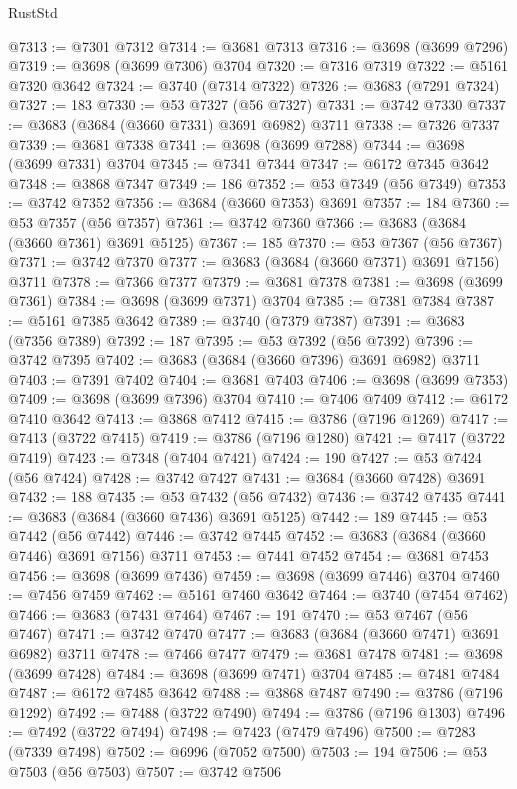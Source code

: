 \begin{lexlean}{RustStd}
\begin{coremodule}
{\begin{coremodule}
{{{{{{{{{{{{{{{{{{{{{{{{{{{{{{{{{{{{{{{{{{{{{{{@7313 := @7301 @7312
@7314 := @3681 @7313
@7316 := @3698 (@3699 @7296)
@7319 := @3698 (@3699 @7306) @3704
@7320 := @7316 @7319
@7322 := @5161 @7320 @3642
@7324 := @3740 (@7314 @7322)
@7326 := @3683 (@7291 @7324)
@7327 := 183
@7330 := @53 @7327 (@56 @7327)
@7331 := @3742 @7330
@7337 := @3683 (@3684 (@3660 @7331) @3691 @6982) @3711
@7338 := @7326 @7337
@7339 := @3681 @7338
@7341 := @3698 (@3699 @7288)
@7344 := @3698 (@3699 @7331) @3704
@7345 := @7341 @7344
@7347 := @6172 @7345 @3642
@7348 := @3868 @7347
@7349 := 186
@7352 := @53 @7349 (@56 @7349)
@7353 := @3742 @7352
@7356 := @3684 (@3660 @7353) @3691
@7357 := 184
@7360 := @53 @7357 (@56 @7357)
@7361 := @3742 @7360
@7366 := @3683 (@3684 (@3660 @7361) @3691 @5125)
@7367 := 185
@7370 := @53 @7367 (@56 @7367)
@7371 := @3742 @7370
@7377 := @3683 (@3684 (@3660 @7371) @3691 @7156) @3711
@7378 := @7366 @7377
@7379 := @3681 @7378
@7381 := @3698 (@3699 @7361)
@7384 := @3698 (@3699 @7371) @3704
@7385 := @7381 @7384
@7387 := @5161 @7385 @3642
@7389 := @3740 (@7379 @7387)
@7391 := @3683 (@7356 @7389)
@7392 := 187
@7395 := @53 @7392 (@56 @7392)
@7396 := @3742 @7395
@7402 := @3683 (@3684 (@3660 @7396) @3691 @6982) @3711
@7403 := @7391 @7402
@7404 := @3681 @7403
@7406 := @3698 (@3699 @7353)
@7409 := @3698 (@3699 @7396) @3704
@7410 := @7406 @7409
@7412 := @6172 @7410 @3642
@7413 := @3868 @7412
@7415 := @3786 (@7196 @1269)
@7417 := @7413 (@3722 @7415)
@7419 := @3786 (@7196 @1280)
@7421 := @7417 (@3722 @7419)
@7423 := @7348 (@7404 @7421)
@7424 := 190
@7427 := @53 @7424 (@56 @7424)
@7428 := @3742 @7427
@7431 := @3684 (@3660 @7428) @3691
@7432 := 188
@7435 := @53 @7432 (@56 @7432)
@7436 := @3742 @7435
@7441 := @3683 (@3684 (@3660 @7436) @3691 @5125)
@7442 := 189
@7445 := @53 @7442 (@56 @7442)
@7446 := @3742 @7445
@7452 := @3683 (@3684 (@3660 @7446) @3691 @7156) @3711
@7453 := @7441 @7452
@7454 := @3681 @7453
@7456 := @3698 (@3699 @7436)
@7459 := @3698 (@3699 @7446) @3704
@7460 := @7456 @7459
@7462 := @5161 @7460 @3642
@7464 := @3740 (@7454 @7462)
@7466 := @3683 (@7431 @7464)
@7467 := 191
@7470 := @53 @7467 (@56 @7467)
@7471 := @3742 @7470
@7477 := @3683 (@3684 (@3660 @7471) @3691 @6982) @3711
@7478 := @7466 @7477
@7479 := @3681 @7478
@7481 := @3698 (@3699 @7428)
@7484 := @3698 (@3699 @7471) @3704
@7485 := @7481 @7484
@7487 := @6172 @7485 @3642
@7488 := @3868 @7487
@7490 := @3786 (@7196 @1292)
@7492 := @7488 (@3722 @7490)
@7494 := @3786 (@7196 @1303)
@7496 := @7492 (@3722 @7494)
@7498 := @7423 (@7479 @7496)
@7500 := @7283 (@7339 @7498)
@7502 := @6996 (@7052 @7500)
@7503 := 194
@7506 := @53 @7503 (@56 @7503)
@7507 := @3742 @7506
}}}}}}}}}}}}}}}}}}}}}}}}}}}}}}}}}}}}}}}}}}}}}}}
\end{coremodule}}
\end{coremodule}
\end{lexlean}
